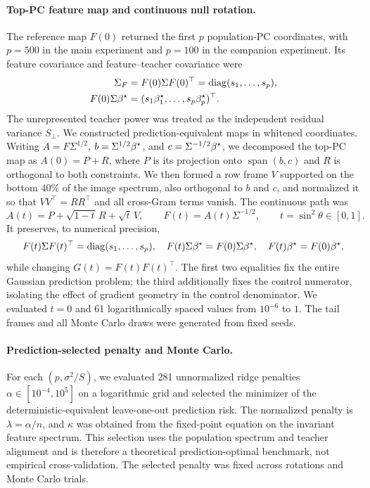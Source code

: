 \paragraph{Top-PC feature map and continuous null rotation.}
The reference map $F(0)$ returned the first $p$ population-PC coordinates,
with $p=500$ in the main experiment and $p=100$ in the companion experiment.
Its feature covariance and feature--teacher covariance were
\begin{align*}
 \Sigma_F&=F(0)\Sigma F(0)^\top
 =\operatorname{diag}(s_1,\ldots,s_p),\\
 F(0)\Sigma{\beta^{\star}}
 &=(s_1\beta_1^\star,\ldots,s_p\beta_p^\star)^\top .
\end{align*}
The unrepresented teacher power was treated as the independent residual
variance $S_\perp$.  We constructed prediction-equivalent maps in whitened
coordinates.
Writing $A=F\Sigma^{1/2}$,
$b=\Sigma^{1/2}{\beta^{\star}}$, and $c=\Sigma^{-1/2}{\beta^{\star}}$, we decomposed the
top-PC map as $A(0)=P+R$, where $P$ is its projection onto
$\operatorname{span}(b,c)$ and $R$ is orthogonal to both constraints.  We then
formed a row frame $V$ supported on the bottom $40\%$ of the image spectrum,
also orthogonal to $b$ and $c$, and normalized it so that
$VV^\top=RR^\top$ and all cross-Gram terms vanish.  The continuous path was
\begin{equation}
 A(t)=P+\sqrt{1-t}\,R+\sqrt{t}\,V,
 \qquad F(t)=A(t)\Sigma^{-1/2},
 \qquad t=\sin^2\theta\in[0,1].
 \label{eq:app-numerical-null-rotation}
\end{equation}
It preserves, to numerical precision,
\begin{equation}
 F(t)\Sigma F(t)^\top=\operatorname{diag}(s_1,\ldots,s_p),\quad
 F(t)\Sigma{\beta^{\star}}=F(0)\Sigma{\beta^{\star}},\quad
 F(t){\beta^{\star}}=F(0){\beta^{\star}},
 \label{eq:app-numerical-null-invariants}
\end{equation}
while changing $G(t)=F(t)F(t)^\top$.  The first two equalities fix the entire
Gaussian prediction problem; the third additionally fixes the control
numerator, isolating the effect of gradient geometry in the control
denominator.  We evaluated $t=0$ and 61 logarithmically spaced values from
$10^{-6}$ to $1$.  The tail frames and all Monte Carlo draws were generated
from fixed seeds.

\paragraph{Prediction-selected penalty and Monte Carlo.}
For each $(p,\sigma^2/S)$, we evaluated 281 unnormalized ridge penalties
$\alpha\in[10^{-4},10^5]$ on a logarithmic grid and selected the minimizer of
the deterministic-equivalent leave-one-out prediction risk.  The normalized
penalty is $\lambda=\alpha/n$, and $\kappa$ was obtained from the fixed-point
equation on the invariant feature spectrum.  This selection uses the
population spectrum and teacher alignment and is therefore a theoretical
prediction-optimal benchmark, not empirical cross-validation.  The selected
penalty was fixed across rotations and Monte Carlo trials.

